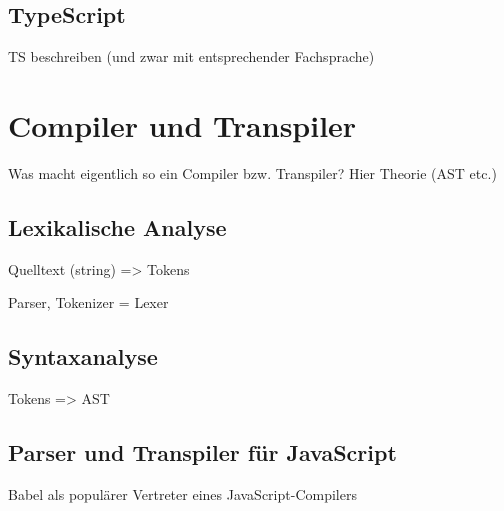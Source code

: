 \subsection{TypeScript}
  TS beschreiben (und zwar mit entsprechender Fachsprache)

\section{Compiler und Transpiler}

  Was macht eigentlich so ein Compiler bzw. Transpiler? Hier Theorie (AST etc.)


  \subsection{Lexikalische Analyse}

    Quelltext (string) => Tokens

    Parser, Tokenizer = Lexer

  \subsection{Syntaxanalyse}

    Tokens => AST


  \subsection{Parser und Transpiler für JavaScript}
  \label{subsec:js-transpilers}

    Babel als populärer Vertreter eines JavaScript-Compilers
